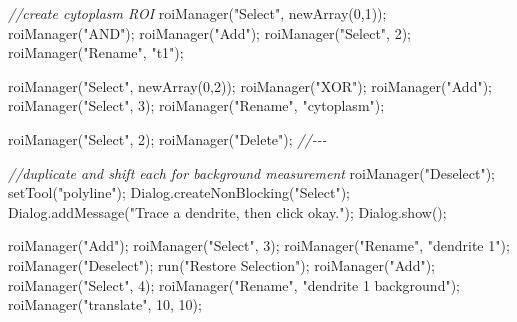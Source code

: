 \documentclass[
  12pt,
  a4paper,
]{book}
\newenvironment{Shaded}{}{}
\newcommand{\CommentTok}[1]{\textcolor[rgb]{0.38,0.63,0.69}{\textit{#1}}}
\newcommand{\DecValTok}[1]{\textcolor[rgb]{0.25,0.63,0.44}{#1}}
\newcommand{\NormalTok}[1]{#1}
\newcommand{\OperatorTok}[1]{\textcolor[rgb]{0.40,0.40,0.40}{#1}}
\newcommand{\StringTok}[1]{\textcolor[rgb]{0.25,0.44,0.63}{#1}}
\begin{document}
\begin{Shaded}
\begin{Highlighting}[]
    \CommentTok{//create cytoplasm ROI}
\NormalTok{    roiManager}\OperatorTok{(}\StringTok{"Select"}\OperatorTok{,}\NormalTok{ newArray}\OperatorTok{(}\DecValTok{0}\OperatorTok{,}\DecValTok{1}\OperatorTok{));}
\NormalTok{    roiManager}\OperatorTok{(}\StringTok{"AND"}\OperatorTok{);}
\NormalTok{    roiManager}\OperatorTok{(}\StringTok{"Add"}\OperatorTok{);}
\NormalTok{    roiManager}\OperatorTok{(}\StringTok{"Select"}\OperatorTok{,} \DecValTok{2}\OperatorTok{);}
\NormalTok{    roiManager}\OperatorTok{(}\StringTok{"Rename"}\OperatorTok{,} \StringTok{"t1"}\OperatorTok{);}
    
\NormalTok{    roiManager}\OperatorTok{(}\StringTok{"Select"}\OperatorTok{,}\NormalTok{ newArray}\OperatorTok{(}\DecValTok{0}\OperatorTok{,}\DecValTok{2}\OperatorTok{));}
\NormalTok{    roiManager}\OperatorTok{(}\StringTok{"XOR"}\OperatorTok{);}
\NormalTok{    roiManager}\OperatorTok{(}\StringTok{"Add"}\OperatorTok{);}
\NormalTok{    roiManager}\OperatorTok{(}\StringTok{"Select"}\OperatorTok{,} \DecValTok{3}\OperatorTok{);}
\NormalTok{    roiManager}\OperatorTok{(}\StringTok{"Rename"}\OperatorTok{,} \StringTok{"cytoplasm"}\OperatorTok{);}

\NormalTok{    roiManager}\OperatorTok{(}\StringTok{"Select"}\OperatorTok{,} \DecValTok{2}\OperatorTok{);}
\NormalTok{    roiManager}\OperatorTok{(}\StringTok{"Delete"}\OperatorTok{);}
    \CommentTok{//{-}{-}{-}}

    \CommentTok{//duplicate and shift each for background measurement}
\NormalTok{    roiManager}\OperatorTok{(}\StringTok{"Deselect"}\OperatorTok{);}
\NormalTok{    setTool}\OperatorTok{(}\StringTok{"polyline"}\OperatorTok{);}
\NormalTok{    Dialog}\OperatorTok{.}\NormalTok{createNonBlocking}\OperatorTok{(}\StringTok{"Select"}\OperatorTok{);}
\NormalTok{    Dialog}\OperatorTok{.}\NormalTok{addMessage}\OperatorTok{(}\StringTok{"Trace a dendrite, then click \textquotesingle{}okay\textquotesingle{}."}\OperatorTok{);}
\NormalTok{    Dialog}\OperatorTok{.}\NormalTok{show}\OperatorTok{();}

\NormalTok{    roiManager}\OperatorTok{(}\StringTok{"Add"}\OperatorTok{);}
\NormalTok{    roiManager}\OperatorTok{(}\StringTok{"Select"}\OperatorTok{,} \DecValTok{3}\OperatorTok{);}
\NormalTok{    roiManager}\OperatorTok{(}\StringTok{"Rename"}\OperatorTok{,} \StringTok{"dendrite 1"}\OperatorTok{);}
\NormalTok{    roiManager}\OperatorTok{(}\StringTok{"Deselect"}\OperatorTok{);}
\NormalTok{    run}\OperatorTok{(}\StringTok{"Restore Selection"}\OperatorTok{);}
\NormalTok{    roiManager}\OperatorTok{(}\StringTok{"Add"}\OperatorTok{);}
\NormalTok{    roiManager}\OperatorTok{(}\StringTok{"Select"}\OperatorTok{,} \DecValTok{4}\OperatorTok{);}
\NormalTok{    roiManager}\OperatorTok{(}\StringTok{"Rename"}\OperatorTok{,} \StringTok{"dendrite 1 background"}\OperatorTok{);}
\NormalTok{    roiManager}\OperatorTok{(}\StringTok{"translate"}\OperatorTok{,} \DecValTok{10}\OperatorTok{,} \DecValTok{10}\OperatorTok{);}
    

\end{Highlighting}
\end{Shaded}
\end{document}
